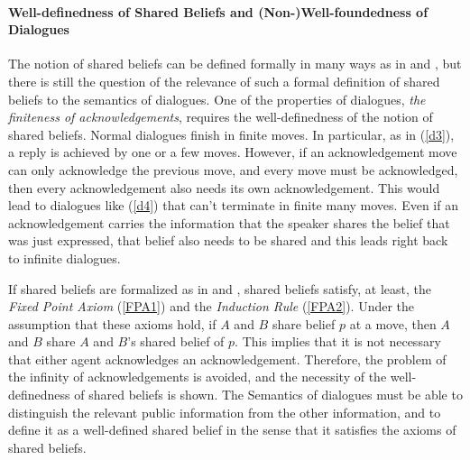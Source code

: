 \paragraph{Well-definedness of Shared Beliefs and (Non-)Well-foundedness of Dialogues}\label{wellfound}
The notion of shared beliefs can be defined formally in many ways as in \cite{Bar89} and \cite{FHMV95}, but there is still the question of the relevance of such a formal definition of shared beliefs to the semantics of dialogues.
One of the properties of dialogues, {\it the finiteness of acknowledgements}, requires the well-definedness of the notion of shared beliefs.
Normal dialogues finish in finite moves.
In particular, as in (\ref{d3}), a reply is achieved by one or a few moves.
However, if an acknowledgement move can only acknowledge the previous move, and every move must be acknowledged, then every acknowledgement also needs its own acknowledgement.
This would lead to dialogues like (\ref{d4}) that can't terminate in finite many moves.
Even if an acknowledgement carries the information that the speaker shares the belief that was just expressed, that belief also needs to be shared and this leads right back to infinite dialogues.
\par
If shared beliefs are formalized as in \cite{Bar89} and \cite{FHMV95}, shared beliefs satisfy, at least, the {\it Fixed Point Axiom} (\ref{FPA1}) and the {\it Induction Rule} (\ref{FPA2}).
Under the assumption that these axioms hold, if $A$ and $B$ share belief $p$ at a move, then $A$ and $B$ share $A$ and $B$'s shared belief of $p$.
This implies that it is not necessary that either agent acknowledges an  acknowledgement.
Therefore, the problem of the infinity of acknowledgements is avoided, and the necessity of the well-definedness of shared beliefs is shown.
The Semantics of dialogues must be able to distinguish the relevant public information from the other information, and to define it as a well-defined shared belief in the sense that it satisfies the axioms of shared beliefs.
\clearpage

